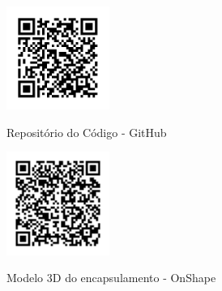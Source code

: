   \begin{figure}[htb!]
    \caption{Repositório do Código - GitHub}
    \label{fig:codigo-apendice}
    \href{https://github.com/AndreyGuimaraes/Oscilocode-v0.1}{\includegraphics[width=0.3\textwidth]{figuras/github-qr-code.png}
    }
    \fonte{}
  \end{figure}
  
  \begin{figure}[htb!]
    \caption{Modelo 3D do encapsulamento - OnShape}
    \label{fig:modelo-apendice}
    \href{https://cad.onshape.com/documents/696dcb32a081fc87effc9aa8/w/ab21c7e27562762800754f6f/e/1b6085ae902c6f67df735465}{\includegraphics[width=0.3\textwidth]{figuras/qr-code-modelo-3d.png}
    }
    \fonte{}
  \end{figure}